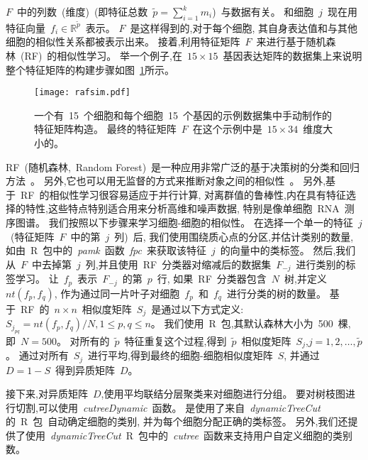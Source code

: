 $F$~中的列数~(维度)~(即特征总数~$\tilde {p} = \sum_{i = 1}^{k} m_{i}$)~与数据有关。
和细胞~$j$~现在用特征向量~$f_{i} \in \mathbb {R} ^ {\tilde{p}}$~表示。
$F$~是这样得到的,对于每个细胞,
其自身表达值和与其他细胞的相似性关系都被表示出来。
接着,利用特征矩阵~$F$~来进行基于随机森林~(RF)~的相似性学习。
举一个例子,在~$15 \times 15$~基因表达矩阵的数据集上来说明整个特征矩阵的构建步骤如图~\ref{fig:rafsim}所示。
\begin{figure}[!htbp]
    \centering
    \texttt{[image: rafsim.pdf]}
    \caption{
        一个有~15~个细胞和每个细胞~15~个基因的示例数据集中手动制作的特征矩阵构造。
        最终的特征矩阵~$F$~在这个示例中是~$15\times34$~维度大小的。
    }
    \label{fig:rafsim}
\end{figure}

RF~(随机森林,~Random Forest)~是一种应用非常广泛的基于决策树的分类和回归方法~\cite{breiman2001random}。
另外,它也可以用无监督的方式来推断对象之间的相似性~\cite{shi2006unsupervised,breiman2011manual,pouyan2018random}。
另外,基于~RF~的相似性学习很容易适应于并行计算,
对离群值的鲁棒性,内在具有特征选择的特性,这些特点特别适合用来分析高维和噪声数据,
特别是像单细胞~RNA~测序图谱。
我们按照以下步骤来学习细胞-细胞的相似性。
在选择一个单一的特征~$j$~(特征矩阵~$F$~中的第~$j$~列)~后, 
我们使用围绕质心点的分区,并估计类别的数量,如由~R~包中的~\textit{pamk}~函数~\textit{fpc}~\cite{package-fpc}来获取该特征~$j$~的向量中的类标签。
然后,我们从~$F$~中去掉第~$j$~列,并且使用~RF~分类器对缩减后的数据集~$F_{-j}$~进行类别的标签学习。
让~$f_p$~表示~$F_{-j}$~的第~$p$~行,
如果~RF~分类器包含~$N$~树,并定义~$nt(f_p,f_q)$, 作为通过同一片叶子对细胞~$f_p$~和~$f_q$~进行分类的树的数量。
基于~RF~的~$n \times n$~相似度矩阵~$S_j$~是通过以下方式定义:
$S_{j_{pq}} = nt(f_p,f_q) / N, 1 \le p,q \le n$。
我们使用~R~包\cite{package-randomforest},其默认森林大小为~500~棵,即~$N=500$。
对所有的~$\tilde{p}$~特征重复这个过程,得到~$\tilde{p}$~相似度矩阵~$S_j$,$j=1,2,\ldots,\tilde{p}$。
通过对所有~$S_j$~进行平均,得到最终的细胞-细胞相似度矩阵~$S$,
并通过~$D=1-S$~得到异质矩阵~$D$。

接下来,对异质矩阵~$D$,使用平均联结分层聚类来对细胞进行分组。
要对树枝图进行切割,可以使用~\textit{cutreeDynamic}~函数。
是使用了来自~\textit{dynamicTreeCut}的~R~包~\cite{langfelder2007defining,package-dynamicTreeCut}自动确定细胞的类别,
并为每个细胞分配正确的类标签。
另外,我们还提供了使用~\textit{dynamicTreeCut}~R~包中的~\textit{cutree}~函数来支持用户自定义细胞的类别数。


